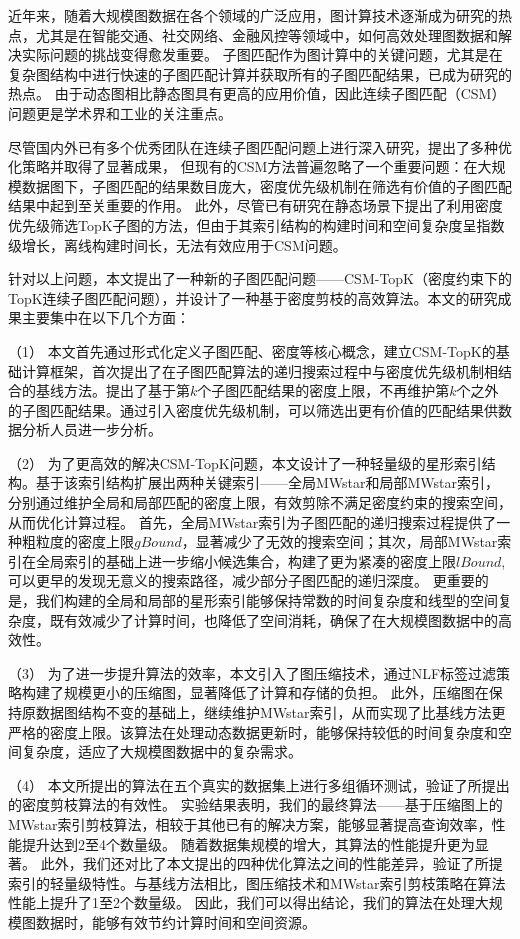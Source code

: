\begin{summary}
	近年来，随着大规模图数据在各个领域的广泛应用，图计算技术逐渐成为研究的热点，尤其是在智能交通、社交网络、金融风控等领域中，如何高效处理图数据和解决实际问题的挑战变得愈发重要。
	子图匹配作为图计算中的关键问题，尤其是在复杂图结构中进行快速的子图匹配计算并获取所有的子图匹配结果，已成为研究的热点。
	由于动态图相比静态图具有更高的应用价值，因此连续子图匹配（CSM）问题更是学术界和工业的关注重点。

	尽管国内外已有多个优秀团队在连续子图匹配问题上进行深入研究，提出了多种优化策略并取得了显著成果，
	但现有的CSM方法普遍忽略了一个重要问题：在大规模数据图下，子图匹配的结果数目庞大，密度优先级机制在筛选有价值的子图匹配结果中起到至关重要的作用。
	此外，尽管已有研究在静态场景下提出了利用密度优先级筛选TopK子图的方法，但由于其索引结构的构建时间和空间复杂度呈指数级增长，离线构建时间长，无法有效应用于CSM问题。
	
	针对以上问题，本文提出了一种新的子图匹配问题——CSM-TopK（密度约束下的TopK连续子图匹配问题），并设计了一种基于密度剪枝的高效算法。本文的研究成果主要集中在以下几个方面：
		
		（1） 本文首先通过形式化定义子图匹配、密度等核心概念，建立CSM-TopK的基础计算框架，首次提出了在子图匹配算法的递归搜索过程中与密度优先级机制相结合的基线方法。提出了基于第$k$个子图匹配结果的密度上限，不再维护第$k$个之外的子图匹配结果。通过引入密度优先级机制，可以筛选出更有价值的匹配结果供数据分析人员进一步分析。

		（2） 为了更高效的解决CSM-TopK问题，本文设计了一种轻量级的星形索引结构。基于该索引结构扩展出两种关键索引——全局MWstar和局部MWstar索引，分别通过维护全局和局部匹配的密度上限，有效剪除不满足密度约束的搜索空间，从而优化计算过程。
		首先，全局MWstar索引为子图匹配的递归搜索过程提供了一种粗粒度的密度上限$gBound$，显著减少了无效的搜索空间；其次，局部MWstar索引在全局索引的基础上进一步缩小候选集合，构建了更为紧凑的密度上限$lBound$,可以更早的发现无意义的搜索路径，减少部分子图匹配的递归深度。
		更重要的是，我们构建的全局和局部的星形索引能够保持常数的时间复杂度和线型的空间复杂度，既有效减少了计算时间，也降低了空间消耗，确保了在大规模图数据中的高效性。

		（3） 为了进一步提升算法的效率，本文引入了图压缩技术，通过NLF标签过滤策略构建了规模更小的压缩图，显著降低了计算和存储的负担。
		此外，压缩图在保持原数据图结构不变的基础上，继续维护MWstar索引，从而实现了比基线方法更严格的密度上限。该算法在处理动态数据更新时，能够保持较低的时间复杂度和空间复杂度，适应了大规模图数据中的复杂需求。
		
		（4） 本文所提出的算法在五个真实的数据集上进行多组循环测试，验证了所提出的密度剪枝算法的有效性。
		实验结果表明，我们的最终算法——基于压缩图上的MWstar索引剪枝算法，相较于其他已有的解决方案，能够显著提高查询效率，性能提升达到2至4个数量级。
		随着数据集规模的增大，其算法的性能提升更为显著。
		此外，我们还对比了本文提出的四种优化算法之间的性能差异，验证了所提索引的轻量级特性。与基线方法相比，图压缩技术和MWstar索引剪枝策略在算法性能上提升了1至2个数量级。
		因此，我们可以得出结论，我们的算法在处理大规模图数据时，能够有效节约计算时间和空间资源。
	

\end{summary}
